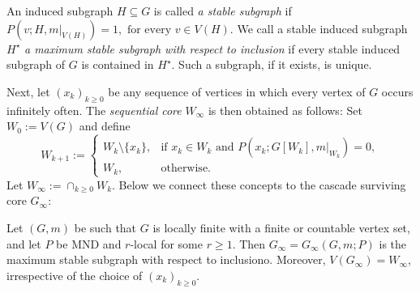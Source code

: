\documentclass[11pt]{article}
\theoremstyle{plain}
\begin{document}
An induced subgraph \(H \subseteq G\) is called \emph{a stable subgraph} if
\(
P(v;H,m|_{V(H)})=1, \text{ for every }v\in V(H).
\)
We call a stable induced subgraph $H^\star$ \emph{a maximum stable subgraph with respect to inclusion}
if every stable induced subgraph of $G$ is contained in $H^\star$. Such a subgraph, if it exists, is unique.

Next, let $(x_k)_{k\ge0}$ be any sequence of vertices in which every vertex
of $G$ occurs infinitely often. 
The \emph{sequential core} $W_\infty$ is then obtained as follows: Set $W_0:=V(G)$ and define
\[
W_{k+1}:=
\begin{cases}
W_k\setminus\{x_k\},&\text{if }x_k\in W_k\text{ and }
P(x_k;G[W_k],m|_{W_k})=0,\\
W_k,&\text{otherwise}.
\end{cases}
\]
Let $W_{\infty}:= \cap_{k\geq 0} W_k$. Below we connect these concepts to the cascade surviving core $G_{\infty}$:
\begin{lemma}
\label{lem:maximal-core}
Let $(G,m)$ be such that $G$ is locally finite with a finite or countable vertex set, and let $P$ be
MND and $r$-local for some $r\ge1$. 
Then $G_\infty=G_\infty(G,m;P)$ is the maximum stable subgraph with respect to inclusiono. Moreover, $V(G_\infty) = W_\infty$, irrespective of the choice of $(x_k)_{k\geq 0}$.
\end{lemma}
\end{document}
